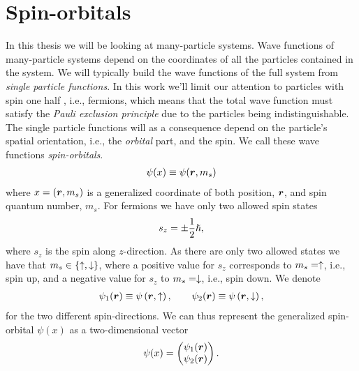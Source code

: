     \section{Spin-orbitals}
        In this thesis we will be looking at many-particle systems.
        Wave functions of many-particle systems depend on the coordinates of all
        the particles contained in the system.
        We will typically build the wave functions of the full system from
        \emph{single particle functions}.
        In this work we'll limit our attention to particles with spin one half ,
        i.e., fermions, which means that the total wave function must satisfy
        the \emph{Pauli exclusion principle} due to the particles being
        indistinguishable.
        The single particle functions will as a consequence depend on the
        particle's spatial orientation, i.e., the \emph{orbital} part, and the
        spin.
        We call these wave functions \emph{spin-orbitals}.
        \begin{align}
            \psi(x) \equiv \psi(\boldsymbol{r}, m_s)
        \end{align}
        where $x = (\boldsymbol{r}, m_s)$ is a generalized coordinate of both
        position, $\boldsymbol{r}$, and spin quantum number, $m_s$.
        For fermions we have only two allowed spin states
        \begin{align}
            s_z = \pm \frac{1}{2}\hslash,
        \end{align}
        where $s_z$ is the spin along $z$-direction.
        As there are only two allowed states we have that $m_s \in
        \left\{ \uparrow, \downarrow \right\}$, where a positive value for $s_z$ corresponds
        to $m_s = \uparrow$, i.e., spin up, and a negative value for $s_z$ to
        $m_s = \downarrow$, i.e., spin down.
        We denote
        \begin{align}
            \psi_1(\boldsymbol{r}) \equiv \psi\left( \boldsymbol{r}, \uparrow \right),
            \qquad
            \psi_2(\boldsymbol{r}) \equiv \psi\left( \boldsymbol{r}, \downarrow \right),
        \end{align}
        for the two different spin-directions.
        We can thus represent the generalized spin-orbital $\psi(x)$ as a
        two-dimensional vector
        \begin{align}
            \psi(x) = \begin{pmatrix}
                \psi_1(\boldsymbol{r}) \\
                \psi_2(\boldsymbol{r})
            \end{pmatrix}.
        \end{align}
